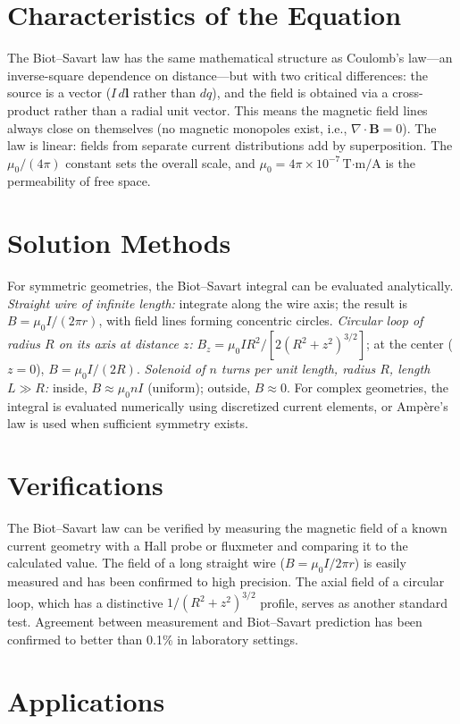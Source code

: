 \documentclass[11pt,openright]{book}
\begin{document}
\section*{Characteristics of the Equation}

The Biot--Savart law has the same mathematical structure as Coulomb's law---an inverse-square dependence on distance---but with two critical differences: the source is a vector ($I\,d\mathbf{l}$ rather than $dq$), and the field is obtained via a cross-product rather than a radial unit vector. This means the magnetic field lines always close on themselves (no magnetic monopoles exist, i.e., $\nabla\cdot\mathbf{B} = 0$). The law is linear: fields from separate current distributions add by superposition. The $\mu_0/(4\pi)$ constant sets the overall scale, and $\mu_0 = 4\pi\times 10^{-7}\,\text{T·m/A}$ is the permeability of free space.
\section*{Solution Methods}

For symmetric geometries, the Biot--Savart integral can be evaluated analytically. \textit{Straight wire of infinite length:} integrate along the wire axis; the result is $B = \mu_0 I / (2\pi r)$, with field lines forming concentric circles. \textit{Circular loop of radius $R$ on its axis at distance $z$:} $B_z = \mu_0 I R^2 / [2(R^2 + z^2)^{3/2}]$; at the center ($z=0$), $B = \mu_0 I/(2R)$. \textit{Solenoid of $n$ turns per unit length, radius $R$, length $L\gg R$:} inside, $B \approx \mu_0 n I$ (uniform); outside, $B\approx 0$. For complex geometries, the integral is evaluated numerically using discretized current elements, or Ampère's law is used when sufficient symmetry exists.
\section*{Verifications}

The Biot--Savart law can be verified by measuring the magnetic field of a known current geometry with a Hall probe or fluxmeter and comparing it to the calculated value. The field of a long straight wire ($B = \mu_0 I / 2\pi r$) is easily measured and has been confirmed to high precision. The axial field of a circular loop, which has a distinctive $1/(R^2+z^2)^{3/2}$ profile, serves as another standard test. Agreement between measurement and Biot--Savart prediction has been confirmed to better than 0.1\% in laboratory settings.
\section*{Applications}
\end{document}
